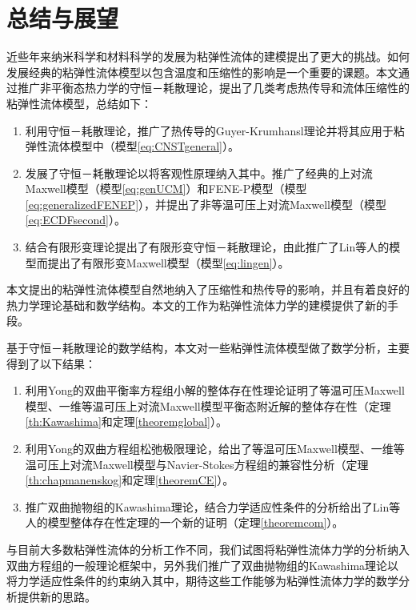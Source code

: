\chapter{总结与展望}

% 
近些年来纳米科学和材料科学的发展为粘弹性流体的建模提出了更大的挑战。如何发展经典的粘弹性流体模型以包含温度和压缩性的影响是一个重要的课题。本文通过推广非平衡态热力学的守恒－耗散理论，提出了几类考虑热传导和流体压缩性的粘弹性流体模型，总结如下：
\begin{enumerate}
	\item 利用守恒－耗散理论，推广了热传导的Guyer-Krumhansl理论并将其应用于粘弹性流体模型中（模型\eqref{eq:CNSTgeneral}）。
	\item 发展了守恒－耗散理论以将客观性原理纳入其中。推广了经典的上对流Maxwell模型（模型\eqref{eq:genUCM}）和FENE-P模型（模型\eqref{eq:generalizedFENEP}），并提出了非等温可压上对流Maxwell模型（模型\eqref{eq:ECDFsecond}）。
	\item 结合有限形变理论提出了有限形变守恒－耗散理论，由此推广了Lin等人的模型而提出了有限形变Maxwell模型（模型\eqref{eq:lingen}）。
\end{enumerate}
本文提出的粘弹性流体模型自然地纳入了压缩性和热传导的影响，并且有着良好的热力学理论基础和数学结构。本文的工作为粘弹性流体力学的建模提供了新的手段。

基于守恒－耗散理论的数学结构，本文对一些粘弹性流体模型做了数学分析，主要得到了以下结果：
\begin{enumerate}
	\item 利用Yong的双曲平衡率方程组小解的整体存在性理论证明了等温可压Maxwell模型、一维等温可压上对流Maxwell模型平衡态附近解的整体存在性（定理\ref{th:Kawashima}和定理\ref{theoremglobal}）。
	\item 利用Yong的双曲方程组松弛极限理论，给出了等温可压Maxwell模型、一维等温可压上对流Maxwell模型与Navier-Stokes方程组的兼容性分析（定理\ref{th:chapmanenskog}和定理\ref{theoremCE}）。
	\item 推广双曲抛物组的Kawashima理论，结合力学适应性条件的分析给出了Lin等人的模型整体存在性定理的一个新的证明（定理\ref{theoremcom}）。
\end{enumerate}
与目前大多数粘弹性流体的分析工作不同，我们试图将粘弹性流体力学的分析纳入双曲方程组的一般理论框架中，另外我们推广了双曲抛物组的Kawashima理论以将力学适应性条件的约束纳入其中，期待这些工作能够为粘弹性流体力学的数学分析提供新的思路。


